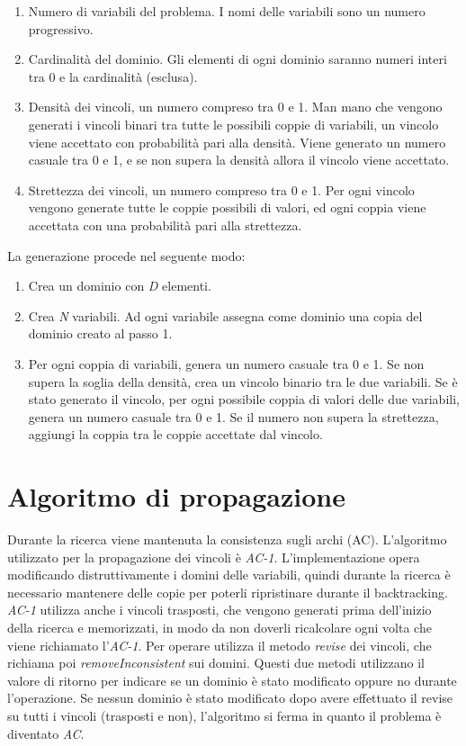 \documentclass[a4paper,12pt,italian]{article}
\begin{document}
\begin{enumerate}
\item Numero di variabili del problema. I nomi delle variabili sono un
  numero progressivo.
\item Cardinalit\`a del dominio. Gli elementi di ogni dominio saranno
  numeri interi tra 0 e la cardinalit\`a (esclusa).
\item Densit\`a dei vincoli, un numero compreso tra 0 e 1. Man mano che vengono generati i vincoli
  binari tra tutte le possibili coppie di variabili, un vincolo viene accettato
  con probabilit\`a pari alla densit\`a. Viene generato un numero
  casuale tra 0 e 1, e se non supera la densit\`a allora il vincolo
  viene accettato.
\item Strettezza dei vincoli, un numero compreso tra 0 e 1. Per ogni
  vincolo vengono generate tutte le coppie possibili di valori, ed
  ogni coppia viene accettata con una probabilit\`a pari alla
  strettezza.
\end{enumerate}

La generazione procede nel seguente modo:
\begin{enumerate}
\item Crea un dominio con \textit{D} elementi.
\item Crea \textit{N} variabili. Ad ogni variabile assegna come
  dominio una copia del dominio creato al passo 1.
\item Per ogni coppia di variabili, genera un numero casuale tra 0 e
  1. Se non supera la soglia della densit\`a, crea un vincolo binario
  tra le due variabili. Se \`e stato generato il vincolo, per ogni
  possibile coppia di valori delle due variabili, genera un numero
  casuale tra 0 e 1. Se il numero non supera la strettezza, aggiungi
  la coppia tra le coppie accettate dal vincolo.
\end{enumerate}

\section{Algoritmo di propagazione}

Durante la ricerca viene mantenuta la consistenza sugli archi
(AC). L'algoritmo utilizzato per la propagazione dei vincoli \`e
\textit{AC-1}. L'implementazione opera modificando distruttivamente i
domini delle variabili, quindi durante la ricerca \`e necessario
mantenere delle copie per poterli ripristinare durante il
backtracking. \textit{AC-1} utilizza anche i vincoli trasposti, che
vengono generati prima dell'inizio della ricerca e memorizzati, in
modo da non doverli ricalcolare ogni volta che viene richiamato l'\textit{AC-1}.
Per operare utilizza il metodo \textit{revise} dei vincoli, che
richiama poi \textit{removeInconsistent} sui domini. Questi due metodi
utilizzano il valore di ritorno per indicare se un dominio \`e stato
modificato oppure no durante l'operazione. Se nessun dominio \`e stato modificato dopo
avere effettuato il revise su tutti i vincoli (trasposti e non),
l'algoritmo si ferma in quanto il problema \`e diventato \textit{AC}.
\end{document}
